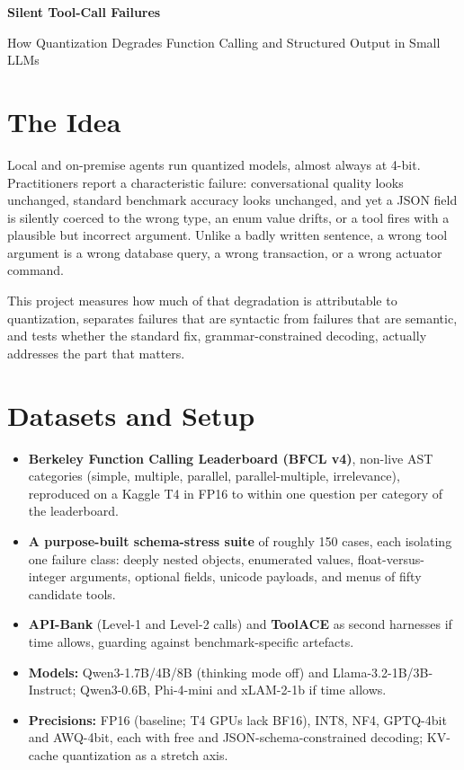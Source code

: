 \documentclass[12pt,a4paper]{article}
\begin{document}
{\centering\huge\bfseries Silent Tool-Call Failures\par}
\vspace{8pt}
{\centering\Large How Quantization Degrades Function Calling and Structured Output in Small LLMs\par}
\vspace{18pt}

\section*{The Idea}

Local and on-premise agents run quantized models, almost always at 4-bit. Practitioners report a
characteristic failure: conversational quality looks unchanged, standard benchmark accuracy looks
unchanged, and yet a JSON field is silently coerced to the wrong type, an enum value drifts, or a
tool fires with a plausible but incorrect argument. Unlike a badly written sentence, a wrong tool
argument is a wrong database query, a wrong transaction, or a wrong actuator command.

This project measures how much of that degradation is attributable to quantization, separates
failures that are syntactic from failures that are semantic, and tests whether the standard fix,
grammar-constrained decoding, actually addresses the part that matters.

\section*{Datasets and Setup}

\begin{itemize}
  \item \textbf{Berkeley Function Calling Leaderboard (BFCL v4)}, non-live AST categories (simple,
        multiple, parallel, parallel-multiple, irrelevance), reproduced on a Kaggle T4 in FP16 to
        within one question per category of the leaderboard.
  \item \textbf{A purpose-built schema-stress suite} of roughly 150 cases, each isolating one failure
        class: deeply nested objects, enumerated values, float-versus-integer arguments, optional
        fields, unicode payloads, and menus of fifty candidate tools.
  \item \textbf{API-Bank} (Level-1 and Level-2 calls) and \textbf{ToolACE} as second harnesses if
        time allows, guarding against benchmark-specific artefacts.
  \item \textbf{Models:} Qwen3-1.7B/4B/8B (thinking mode off) and Llama-3.2-1B/3B-Instruct;
        Qwen3-0.6B, Phi-4-mini and xLAM-2-1b if time allows.
  \item \textbf{Precisions:} FP16 (baseline; T4 GPUs lack BF16), INT8, NF4, GPTQ-4bit and AWQ-4bit,
        each with free and JSON-schema-constrained decoding; KV-cache quantization as a stretch axis.
\end{itemize}
\end{document}
